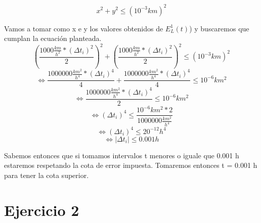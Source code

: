 \documentclass[a4paper,10pt]{article}
\begin{document}
\begin{equation}
	x^2 + y^2 \leq (10^{-3} km)^2
\end{equation}
\par Vamos a tomar como x e y los valores obtenidos de $E_L^1(t)$) y buscaremos que cumplan la ecuación planteada.
\begin{equation}
	(\frac{1000 \frac{km}{h^2} * (\Delta t_i)^2}{2})^2 + (\frac{1000 \frac{km}{h^2} * (\Delta t_i)^2}{2})^2 \leq (10^{-3} km)^2
\end{equation}
\begin{equation}
	\Leftrightarrow \frac{1000000 \frac{km^2}{h^4} * (\Delta t_i)^4}{4} + \frac{1000000 \frac{km^2}{h^4} * (\Delta t_i)^4}{4} \leq 10^{-6} km^2
\end{equation}
\begin{equation}
	\Leftrightarrow \frac{1000000 \frac{km^2}{h^4} * (\Delta t_i)^4}{2} \leq 10^{-6} km^2
\end{equation}
\begin{equation}
	\Leftrightarrow (\Delta t_i)^4 \leq \frac{10^{-6} km^2 * 2}{1000000 \frac{km^2}{h^4}}
\end{equation}
\begin{equation}
	\Leftrightarrow (\Delta t_i)^4 \leq 20^{-12} h^4
\end{equation}
\begin{equation}
	\Leftrightarrow | \Delta t_i | \leq 0.001 h
\end{equation}
\par Sabemos entonces que si tomamos intervalos \Delta t menores o iguale que 0.001 h estaremos respetando la cota de error impuesta. Tomaremos entonces \Delta t = 0.001 h para tener la cota superior.

\section{Ejercicio 2}
\end{document}
